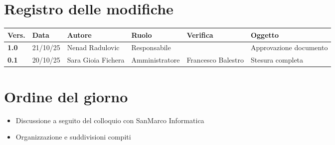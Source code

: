 \documentclass[a4paper,12pt]{article}
\begin{document}


\newpage
\section*{Registro delle modifiche}

\begin{table}[h!]
\begin{tabularx}{\textwidth}{|l|l|l|l|L|L|}
\hline
\textbf{Vers.} & \textbf{Data} & \textbf{Autore} & \textbf{Ruolo} & \textbf{Verifica} & \textbf{Oggetto} \\
\hline
\textbf{1.0} & 21/10/25 & Nenad Radulovic & Responsabile &  & Approvazione documento \\
\textbf{0.1} & 20/10/25 & Sara Gioia Fichera & Amministratore & Francesco Balestro & Stesura completa \\
\hline
\end{tabularx}
\end{table}

\newpage
\tableofcontents
\newpage

\markright{}

\newpage
\section{Ordine del giorno}

\begin{itemize}
    \item Discussione a seguito del colloquio con SanMarco Informatica
    \item Organizzazione e suddivisioni compiti
\end{itemize}
\newp
\end{document}
